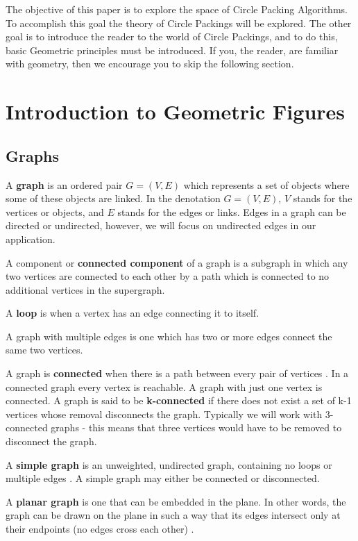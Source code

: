 \documentclass[11pt]{article}
\begin{document}
The objective of this paper is to explore the space of Circle Packing Algorithms. To accomplish this goal the theory of Circle Packings will be explored. The other goal is to introduce the reader to the world of Circle Packings, and to do this, basic Geometric principles must be introduced. If you, the reader, are familiar with geometry, then we encourage you to skip the following section.

\section{Introduction to Geometric Figures}
\subsection{Graphs}
A \textbf{graph} is an ordered pair $G=(V,E)$ which represents a set of objects where some of these objects are linked. In the denotation $G=(V,E)$, $V$ stands for the vertices or objects, and $E$ stands for the edges or links. Edges in a graph can be directed or undirected, however, we will focus on undirected edges in our application.

  A component or \textbf{connected component} of a graph is a subgraph in which any two vertices are connected to each other by a path which is connected to no additional vertices in the supergraph.

  A \textbf{loop} is when a vertex has an edge connecting it to itself.
  
  A graph with multiple edges is one which has two or more edges connect the same two vertices.

  A graph is \textbf{connected} when there is a path between every pair of vertices \cite{mathworld:ConnectedGraphs}. 
  In a connected graph every vertex is reachable. A graph with just one vertex is connected. A graph is said to be \textbf{k-connected} if there does not exist a set of k-1 vertices whose removal disconnects the graph. Typically we will work with 3-connected graphs - this means that three vertices would have to be removed to disconnect the graph.
  
  A \textbf{simple graph} is an unweighted, undirected graph, containing no loops or multiple edges \cite{mathworld:SimpleGraphs}. 
  A simple graph may either be connected or disconnected.
  
  A \textbf{planar graph} is one that can be embedded in the plane. 
  In other words, the graph can be drawn on the plane in such a way that its edges intersect only at their endpoints (no edges cross each other) \cite{mathworld:PlanarGraph}.
  
\end{document}
